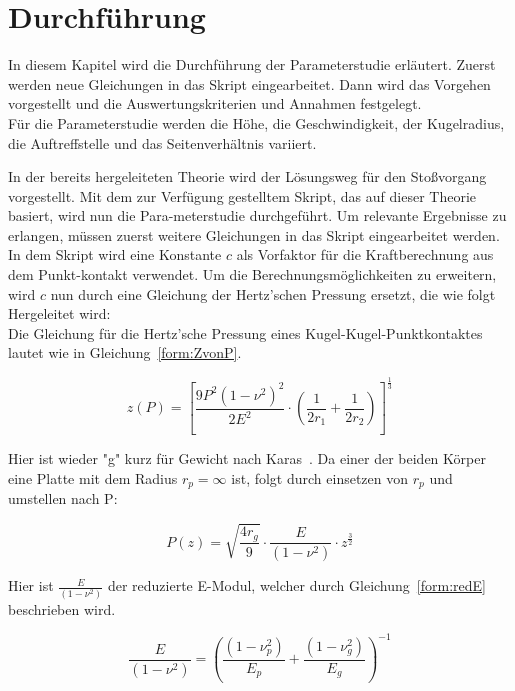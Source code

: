 \chapter{Durchführung}
\label{chap:Durchfuehrung}

In diesem Kapitel wird die Durchführung der Parameterstudie erläutert. Zuerst werden neue Gleichungen in das Skript eingearbeitet. Dann wird das Vorgehen vorgestellt und die Auswertungskriterien und Annahmen festgelegt.\\
Für die Parameterstudie werden die Höhe, die Geschwindigkeit, der Kugelradius, die Auftreffstelle und das Seitenverhältnis variiert.

In der bereits hergeleiteten Theorie wird der Lösungsweg für den Stoßvorgang vorgestellt. Mit dem zur Verfügung gestelltem Skript, das auf dieser Theorie basiert, wird nun die Para-meterstudie durchgeführt. Um relevante Ergebnisse zu erlangen, müssen zuerst weitere Gleichungen in das Skript eingearbeitet werden.\\
In dem Skript wird eine Konstante $c$ als Vorfaktor für die Kraftberechnung aus dem Punkt-kontakt verwendet. Um die Berechnungsmöglichkeiten zu erweitern, wird $c$ nun durch eine Gleichung der Hertz'schen Pressung ersetzt, die wie folgt Hergeleitet wird:\\
Die Gleichung für die Hertz'sche Pressung eines Kugel-Kugel-Punktkontaktes lautet wie in Gleichung~\ref{form:ZvonP}.

\begin{equation}
	\label{form:ZvonP}
	z(P) = \left[ \frac{9 P^{2} (1 - \nu^{2})^{2}}{2 E^{2}} \cdot \left( \frac{1}{2 r_{1}} + \frac{1}{2 r_{2}} \right) \right]^{\frac{1}{3}}
\end{equation}

Hier ist wieder "g" kurz für Gewicht nach Karas~\cite{Karas.1939}. Da einer der beiden Körper eine Platte mit dem Radius $r_{p} = \infty$ ist, folgt durch einsetzen von $r_{p}$ und umstellen nach P:

\begin{equation}
	\label{form:PvonZ}
	P(z) = \sqrt{\frac{4 r_{g}}{9}} \cdot \frac{E}{(1 - \nu^{2})} \cdot z^{\frac{3}{2}}
\end{equation}
	
Hier ist $\frac{E}{(1 - \nu^{2})}$ der reduzierte E-Modul, welcher durch Gleichung~\ref{form:redE} beschrieben wird.

\begin{equation}
	\label{form:redE}
	\frac{E}{(1 - \nu^{2})} = \left( \frac{(1 - \nu_{p}^{2})}{E_{p}} + \frac{(1 - \nu_{g}^{2})}{E_{g}} \right)^{-1}
\end{equation} 

